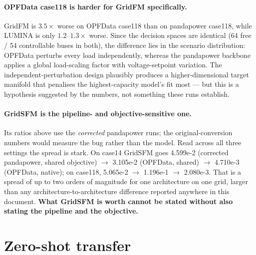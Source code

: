 \documentclass[10pt]{article}
\begin{document}
\paragraph{OPFData case118 is harder for GridFM specifically.} GridFM is
\(3.5\times\) worse on OPFData case118 than on pandapower case118, while LUMINA
is only \(1.2\)--\(1.3\times\) worse. Since the decision spaces are identical
(64 free / 54 controllable buses in both), the difference lies in the scenario
distribution: OPFData perturbs every load independently, whereas the pandapower
backbone applies a global load-scaling factor with voltage-setpoint variation.
The independent-perturbation design plausibly produces a higher-dimensional
target manifold that penalises the highest-capacity model's fit most --- but
this is a hypothesis suggested by the numbers, not something these runs
establish.

\paragraph{GridSFM is the pipeline- and objective-sensitive one.} Its ratios
above use the \emph{corrected} pandapower runs; the original-conversion numbers
would measure the bug rather than the model. Read across all three settings the
spread is stark. On case14 GridSFM goes 4.599e-2 (corrected pandapower,
shared objective) \(\rightarrow\) 3.105e-2 (OPFData, shared) \(\rightarrow\)
4.710e-3 (OPFData, native); on case118, 5.065e-2 \(\rightarrow\) 1.196e-1
\(\rightarrow\) 2.080e-3. That is a spread of up to two orders of magnitude for
one architecture on one grid, larger than any architecture-to-architecture
difference reported anywhere in this document. \textbf{What GridSFM is worth
cannot be stated without also stating the pipeline and the objective.}

\section{Zero-shot transfer}
\end{document}
